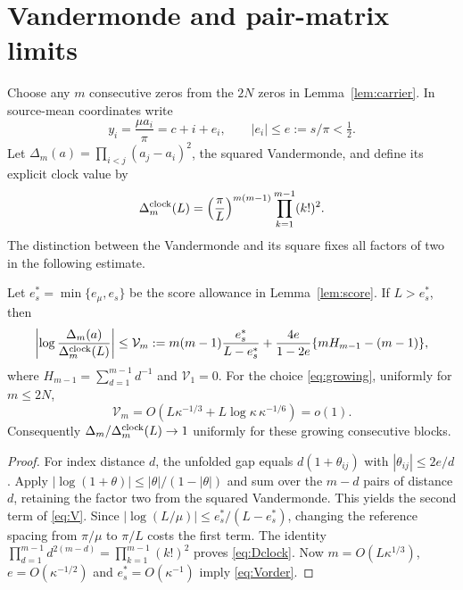 \section{Vandermonde and pair-matrix limits}\label{sec:geometry}
Choose any $m$ consecutive zeros from the $2N$ zeros in
Lemma~\ref{lem:carrier}. In source-mean coordinates write
\[
 y_i=\frac{\mu a_i}{\pi}=c+i+e_i,\qquad |e_i|\le e:=s/\pi<\tfrac12 .
\]
Let $\Delta_m(a)=\prod_{i<j}(a_j-a_i)^2$, the squared
Vandermonde, and define its explicit clock value by
\begin{equation}
 \Delta_m^{\rm clock}(L)=
 \left(\frac{\pi}{L}\right)^{m(m-1)}
       \prod_{k=1}^{m-1}(k!)^2 .
 \label{eq:Dclock}
\end{equation}
The distinction between the Vandermonde and its square fixes all
factors of two in the following estimate.

\begin{theorem}\label{thm:V}
Let $e_s^*=\min\{e_\mu,e_s\}$ be the score allowance in
Lemma~\ref{lem:score}. If $L>e_s^*$, then
\begin{equation}
 \left|\log\frac{\Delta_m(a)}{\Delta_m^{\rm clock}(L)}\right|
 \le \mathcal V_m:=
 m(m-1)\frac{e_s^*}{L-e_s^*}
 +\frac{4e}{1-2e}\{mH_{m-1}-(m-1)\},
 \label{eq:V}
\end{equation}
where $H_{m-1}=\sum_{d=1}^{m-1}d^{-1}$ and $\mathcal V_1=0$.
For the choice \eqref{eq:growing}, uniformly for $m\le2N$,
\begin{equation}
 \mathcal V_m=O(L\kappa^{-1/3}
                    +L\log\kappa\,\kappa^{-1/6})=o(1).
 \label{eq:Vorder}
\end{equation}
Consequently $\Delta_m/\Delta_m^{\rm clock}(L)\to1$ uniformly
for these growing consecutive blocks.
\end{theorem}
\begin{proof}
For index distance $d$, the unfolded gap equals
$d(1+\theta_{ij})$ with $|\theta_{ij}|\le2e/d$.
Apply $|\log(1+\theta)|\le|\theta|/(1-|\theta|)$
and sum over the $m-d$ pairs of distance $d$, retaining the factor two
from the squared Vandermonde. This yields the second term of
\eqref{eq:V}. Since
$|\log(L/\mu)|\le e_s^*/(L-e_s^*)$, changing the reference spacing
from $\pi/\mu$ to $\pi/L$ costs the first term.
The identity $\prod_{d=1}^{m-1}d^{2(m-d)}
=\prod_{k=1}^{m-1}(k!)^2$ proves \eqref{eq:Dclock}.
Now $m=O(L\kappa^{1/3})$, $e=O(\kappa^{-1/2})$ and
$e_s^*=O(\kappa^{-1})$ imply \eqref{eq:Vorder}.
\end{proof}

